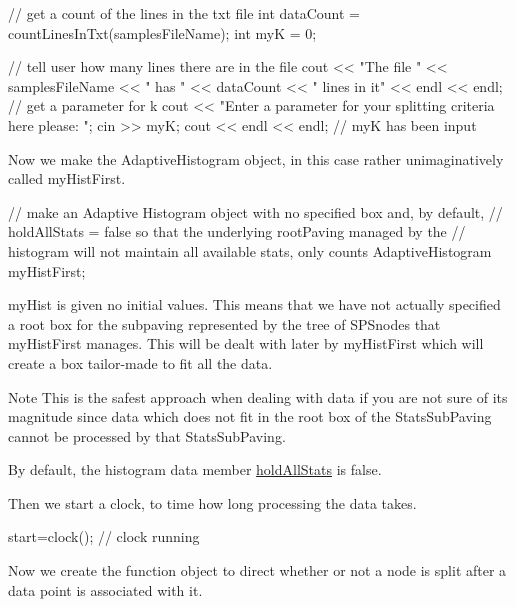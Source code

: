 \begin{DoxyCodeInclude}
    // get a count of the lines in the txt file
    int dataCount = countLinesInTxt(samplesFileName);
    int myK = 0;

    // tell user how many lines there are in the file
    cout << "The file " << samplesFileName << " has " << dataCount
            << " lines in it" << endl << endl;
    // get a parameter for k
    cout << "Enter a parameter for your splitting criteria here please:  ";
    cin >> myK;
    cout << endl << endl; // myK has been input

\end{DoxyCodeInclude}


\-Now we make the \-Adaptive\-Histogram object, in this case rather unimaginatively called my\-Hist\-First.


\begin{DoxyCodeInclude}
    // make an Adaptive Histogram object with no specified box and, by default,
    // holdAllStats = false so that the underlying rootPaving managed by the
    // histogram will not maintain all available stats, only counts
    AdaptiveHistogram myHistFirst;

\end{DoxyCodeInclude}


my\-Hist is given no initial values. \-This means that we have not actually specified a root box for the subpaving represented by the tree of \-S\-P\-Snodes that my\-Hist\-First manages. \-This will be dealt with later by my\-Hist\-First which will create a box tailor-\/made to fit all the data.

\begin{DoxyNote}{\-Note}
\-This is the safest approach when dealing with data if you are not sure of its magnitude since data which does not fit in the root box of the \-Stats\-Sub\-Paving cannot be processed by that \-Stats\-Sub\-Paving.
\end{DoxyNote}
\-By default, the histogram data member \hyperlink{AdaptiveHistograms_ADHholdallstats}{hold\-All\-Stats} is false.

\-Then we start a clock, to time how long processing the data takes.


\begin{DoxyCodeInclude}
    start=clock();
    // clock running

\end{DoxyCodeInclude}


\-Now we create the function object to direct whether or not a node is split after a data point is associated with it.


